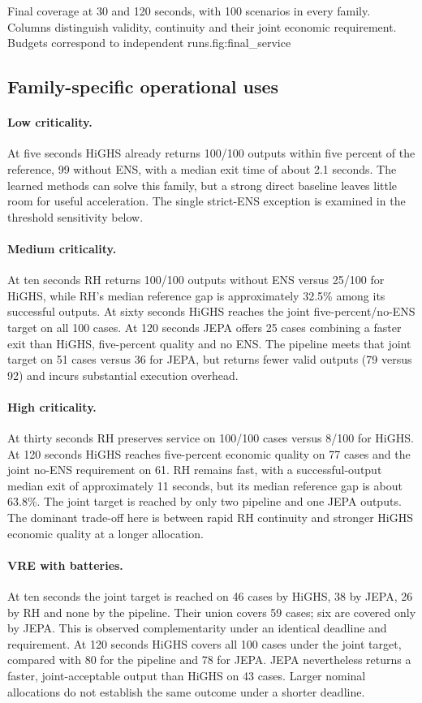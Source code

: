 {Final coverage at 30 and 120 seconds, with 100 scenarios in every family.
Columns distinguish validity, continuity and their joint economic requirement.
Budgets correspond to independent runs.}{fig:final_service}

\subsection{Family-specific operational uses}
\paragraph{Low criticality.}
At five seconds HiGHS already returns 100/100 outputs within five percent of
the reference, 99 without ENS, with a median exit time of about 2.1 seconds.
The learned methods can solve this family, but a strong direct baseline leaves
little room for useful acceleration. The single strict-ENS exception is
examined in the threshold sensitivity below.

\paragraph{Medium criticality.}
At ten seconds RH returns 100/100 outputs without ENS versus 25/100 for HiGHS,
while RH's median reference gap is approximately 32.5\% among its successful
outputs. At sixty seconds HiGHS reaches the joint five-percent/no-ENS target
on all 100 cases. At 120 seconds JEPA offers 25 cases combining a faster
exit than HiGHS, five-percent quality and no ENS. The pipeline meets that
joint target on 51 cases versus 36 for JEPA, but returns fewer valid outputs
(79 versus 92) and incurs substantial execution overhead.

\paragraph{High criticality.}
At thirty seconds RH preserves service on 100/100 cases versus 8/100 for HiGHS.
At 120 seconds HiGHS reaches five-percent economic quality on 77 cases and
the joint no-ENS requirement on 61. RH remains fast, with a successful-output
median exit of approximately 11 seconds, but its median reference gap is
about 63.8\%. The joint target is reached by only two pipeline and one JEPA
outputs. The dominant trade-off here is between rapid RH continuity and
stronger HiGHS economic quality at a longer allocation.

\paragraph{VRE with batteries.}
At ten seconds the joint target is reached on 46 cases by HiGHS, 38 by JEPA,
26 by RH and none by the pipeline. Their union covers 59 cases; six are
covered only by JEPA. This is observed complementarity under an identical
deadline and requirement. At 120 seconds HiGHS covers all 100 cases under
the joint target, compared with 80 for the pipeline and 78 for JEPA.
JEPA nevertheless returns a faster, joint-acceptable output than HiGHS on
43 cases. Larger nominal allocations do not establish the same outcome
under a shorter deadline.

